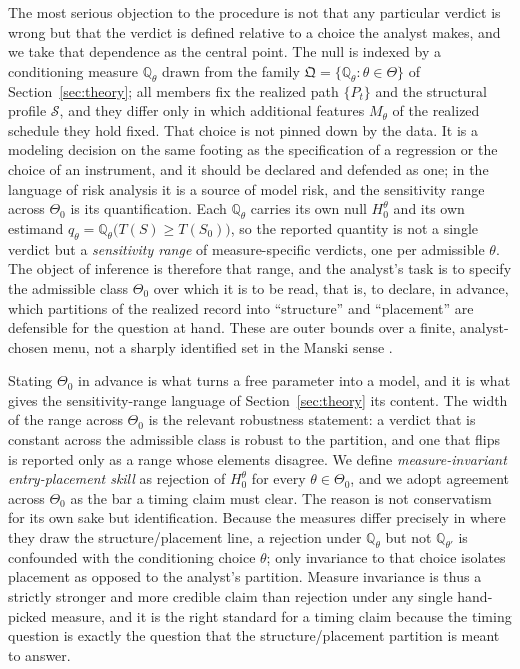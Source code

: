 \documentclass[risks,article,submit,pdftex,oneauthor]{Definitions/mdpi}
\begin{document}
The most serious objection to the procedure is not that any particular verdict is
wrong but that the verdict is defined relative to a choice the analyst makes, and we
take that dependence as the central point. The null is indexed by a conditioning
measure $\mathbb{Q}_\theta$ drawn from the family
$\mathfrak{Q}=\{\mathbb{Q}_\theta:\theta\in\Theta\}$ of Section~\ref{sec:theory}; all
members fix the realized path $\{P_t\}$ and the structural profile $\mathcal{S}$, and
they differ only in which additional features $M_\theta$ of the realized schedule
they hold fixed. That choice is not pinned down by the data. It is a modeling
decision on the same footing as the specification of a regression or the choice of an
instrument, and it should be declared and defended as one; in the language of risk
analysis it is a source of model risk, and the sensitivity range across $\Theta_0$ is
its quantification. Each $\mathbb{Q}_\theta$ carries its own null $H_0^\theta$ and its
own estimand $q_\theta=\mathbb{Q}_\theta\big(T(S)\ge T(S_0)\big)$, so the reported
quantity is not a single verdict but a \emph{sensitivity range} of measure-specific
verdicts, one per admissible $\theta$. The object of inference is therefore that
range, and the analyst's task is to specify the admissible class $\Theta_0$ over
which it is to be read, that is, to declare, in advance, which partitions of the
realized record into ``structure'' and ``placement'' are defensible for the question
at hand. These are outer bounds over a finite, analyst-chosen menu, not a sharply
identified set in the Manski sense \citep{Manski2003,Tamer2010}.

Stating $\Theta_0$ in advance is what turns a free parameter into a model, and it is
what gives the sensitivity-range language of Section~\ref{sec:theory} its content.
The width of the range across $\Theta_0$ is the relevant robustness statement: a
verdict that is constant across the admissible class is robust to the partition, and
one that flips is reported only as a range whose elements disagree. We define
\emph{measure-invariant entry-placement skill} as rejection of $H_0^\theta$ for every
$\theta\in\Theta_0$, and we adopt agreement across $\Theta_0$ as the bar a timing
claim must clear. The reason is not conservatism for its own sake but identification.
Because the measures differ precisely in where they draw the structure/placement
line, a rejection under $\mathbb{Q}_\theta$ but not $\mathbb{Q}_{\theta'}$ is
confounded with the conditioning choice $\theta$; only invariance to that choice
isolates placement as opposed to the analyst's partition. Measure invariance is thus
a strictly stronger and more credible claim than rejection under any single
hand-picked measure, and it is the right standard for a timing claim because the
timing question is exactly the question that the structure/placement partition is
meant to answer.
\end{document}
